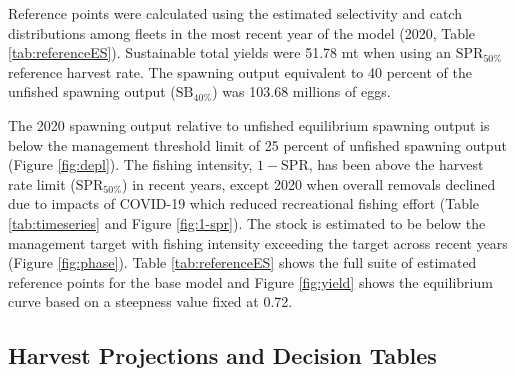 \documentclass[11pt,
  english,
  a4paper,
]{article}
\begin{document}
Reference points were calculated using the estimated selectivity and catch distributions among fleets in the most recent year of the model (2020, Table \ref{tab:referenceES}). Sustainable total yields were 51.78 mt when using an {\(\text{SPR}_{50\%}\)\leavevmode\tagmcend\tagstructend} reference harvest rate. The spawning output equivalent to 40 percent of the unfished spawning output ({\(\text{SB}_{40\%}\)\leavevmode\tagmcend\tagstructend}) was 103.68 millions of eggs.

\leavevmode\tagmcend\tagstructend\par


The 2020 spawning output relative to unfished equilibrium spawning output is below the management threshold limit of 25 percent of unfished spawning output (Figure \ref{fig:depl}). The fishing intensity, {\(1-\text{SPR}\)\leavevmode\tagmcend\tagstructend}, has been above the harvest rate limit ({\(\text{SPR}_{50\%}\)\leavevmode\tagmcend\tagstructend}) in recent years, except 2020 when overall removals declined due to impacts of COVID-19 which reduced recreational fishing effort (Table \ref{tab:timeseries} and Figure \ref{fig:1-spr}). The stock is estimated to be below the management target with fishing intensity exceeding the target across recent years (Figure \ref{fig:phase}). Table \ref{tab:referenceES} shows the full suite of estimated reference points for the base model and Figure \ref{fig:yield} shows the equilibrium curve based on a steepness value fixed at 0.72.

\leavevmode\tagmcend\tagstructend\par


\hypertarget{harvest-projections-and-decision-tables}{%
\subsection{Harvest Projections and Decision Tables}\label{harvest-projections-and-decision-tables}}

\leavevmode\tagmcend\tagstructend

\end{document}
